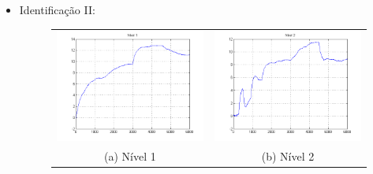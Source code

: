 \begin{itemize}
\newpage \item Identificação II:
\begin{figure}[H]
	\centering
	\begin{tabular}{cc}
		\includegraphics[height=0.15\paperheight,keepaspectratio]{img/sim2_h1.png} &
		\includegraphics[height=0.15\paperheight,keepaspectratio]{img/sim2_h2.png} \\
		(a) Nível 1 &
		(b) Nível 2 \\

\end{tabular}
\end{figure}
\end{itemize}

